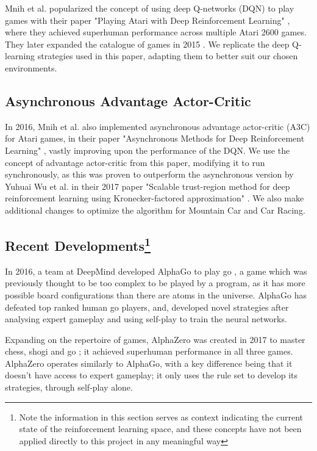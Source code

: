 

Mnih et al. popularized the concept of using deep Q-networks (DQN) to play
games with their paper "Playing Atari with Deep Reinforcement Learning"
\cite{mnih2013playing}, where they achieved superhuman performance across
multiple Atari 2600 games. They later expanded the catalogue of games in 2015
\cite{mnih2015human}. We replicate the deep Q-learning strategies used in this
paper, adapting them to better suit our chosen environments.

\subsection{Asynchronous Advantage Actor-Critic}
In 2016, Mnih et al. also implemented asynchronous advantage actor-critic (A3C)
for Atari games, in their paper "Asynchronous Methods for Deep Reinforcement
Learning" \cite{mnih2016asynchronous}, vastly improving upon the performance of
the DQN. We use the concept of advantage actor-critic from this paper,
modifying it to run synchronously, as this was proven to outperform the
asynchronous version by Yuhuai Wu et al. in their 2017 paper "Scalable
trust-region method for deep reinforcement learning using Kronecker-factored
approximation" \cite{wu2017scalable}. We also make additional changes to
optimize the algorithm for Mountain Car and Car Racing.

\subsection[Recent Developments]{Recent Developments\footnote{Note the information in this section serves as context indicating the current state of the reinforcement learning space, and these concepts have not been applied directly to this project in any meaningful way}}

In 2016, a team at DeepMind developed AlphaGo to play go
\cite{silver2016mastering}, a game which was previously thought to be too
complex to be played by a program, as it has more possible board configurations
than there are atoms in the universe. AlphaGo has defeated top ranked human go
players, and, developed novel strategies after analysing expert gameplay and
using self-play to train the neural networks.

Expanding on the repertoire of games, AlphaZero was created in 2017 to master
chess, shogi and go \cite{silver2017mastering}; it achieved superhuman
performance in all three games. AlphaZero operates similarly to AlphaGo, with a
key difference being that it doesn't have access to expert gameplay; it only
uses the rule set to develop its strategies, through self-play alone.


